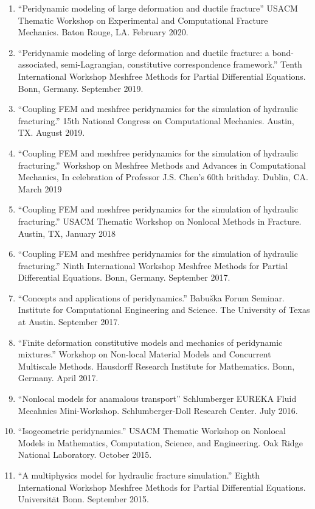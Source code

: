 \begin{etaremune}
\else
\begin{enumerate}
\fi
    \item ``Peridynamic modeling of large deformation and ductile fracture'' USACM Thematic Workshop on Experimental and Computational Fracture Mechanics. Baton Rouge, LA. February 2020.
    \item ``Peridynamic modeling of large deformation and ductile fracture: a bond-associated, semi-Lagrangian, constitutive correspondence framework.'' Tenth International Workshop Meshfree Methods for Partial Differential Equations. Bonn, Germany. September 2019.
    \item ``Coupling FEM and meshfree peridynamics for the simulation of hydraulic fracturing.'' 15th National Congress on Computational Mechanics. Austin, TX. August 2019.
    \item ``Coupling FEM and meshfree peridynamics for the simulation of hydraulic fracturing.'' Workshop on Meshfree Methods and Advances in Computational Mechanics, In celebration of Professor J.S. Chen's 60th brithday.  Dublin, CA.  March 2019
    \item ``Coupling FEM and meshfree peridynamics for the simulation of hydraulic fracturing.'' USACM Thematic Workshop on Nonlocal Methods in Fracture.  Austin, TX, January 2018
    \item ``Coupling FEM and meshfree peridynamics for the simulation of hydraulic fracturing.'' Ninth International Workshop Meshfree Methods for Partial Differential Equations. Bonn, Germany. September 2017.
    \item ``Concepts and applications of peridynamics.'' Babu\v{s}ka Forum Seminar. Institute for Computational Engineering and Science. The University of Texas at Austin. September 2017.
    \item ``Finite deformation constitutive models and mechanics of peridynamic mixtures.'' Workshop on Non-local Material Models and Concurrent Multiscale Methods. Hausdorff Research Institute for Mathematics.  Bonn, Germany.  April 2017.
    \item ``Nonlocal models for anamalous transport'' Schlumberger EUREKA Fluid Mecahnics Mini-Workshop. Schlumberger-Doll Research Center. July 2016.
    \item ``Isogeometric peridynamics.'' USACM Thematic Workshop on Nonlocal Models in Mathematics, Computation, Science, and Engineering.  Oak Ridge National Laboratory. October 2015.
    \item ``A multiphysics model for hydraulic fracture simulation.''  Eighth International Workshop Meshfree Methods for Partial Differential Equations. Universit\"{a}t Bonn. September 2015.

\end{enumerate}
\end{etaremune}
